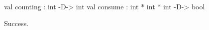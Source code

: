 \chklistingtrue
{}
\begin{ChkListingMsg}
val counting : int -D-> int
val consume : int * int * int -D-> bool
\end{ChkListingMsg}
\begin{ChkListingErr}
Success.
\end{ChkListingErr}
